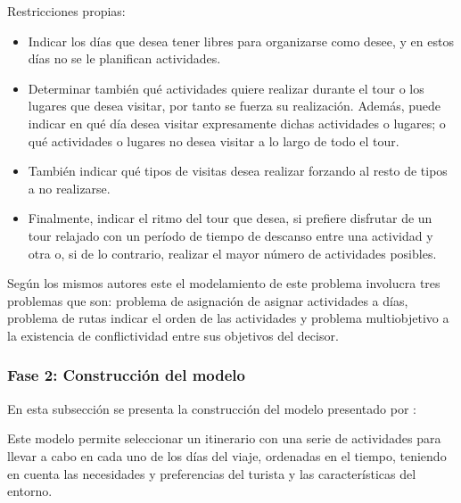 \begin{itemize}
    Restricciones propias:
    \begin{itemize}
        \item Indicar los días que desea tener libres para organizarse como desee, y en estos días no se le planifican actividades.
        \item Determinar también qué actividades quiere realizar durante el tour o los lugares que desea visitar, por tanto se fuerza su realización. Además, puede indicar en qué día desea visitar expresamente dichas actividades o lugares; o qué actividades o lugares no desea visitar a lo largo de todo el tour.
        \item También indicar qué tipos de visitas desea realizar forzando al resto de tipos a no realizarse.
        \item Finalmente, indicar el ritmo del tour que desea, si prefiere disfrutar de un tour relajado con un período de tiempo de descanso entre una actividad y otra o, si de lo contrario, realizar el mayor número de actividades posibles.
    \end{itemize}
    Según los mismos autores este el modelamiento de este problema involucra tres problemas que son: problema de asignación de asignar actividades a días, problema de rutas indicar el orden de las actividades y problema multiobjetivo a la existencia de conflictividad entre sus objetivos del decisor.
\end{itemize}
\subsubsection{Fase 2: Construcción del modelo}
En esta subsección se presenta la construcción del modelo presentado por :

Este modelo permite seleccionar un itinerario con una serie de actividades para llevar a cabo en cada uno de los días del viaje, ordenadas en el tiempo, teniendo en cuenta las necesidades y preferencias del turista y las características del entorno.

